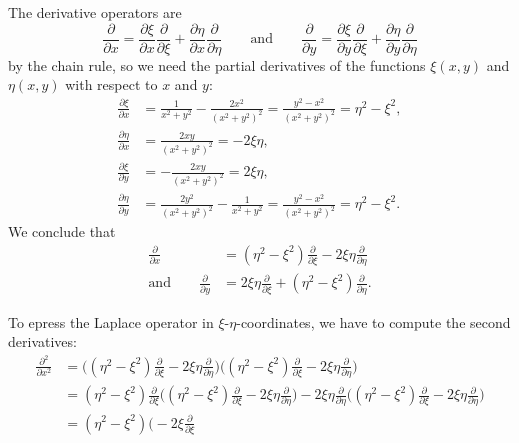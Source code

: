 \begin{loesung}
\begin{teilaufgaben}
\item
The derivative operators are 
\[
\frac{\partial}{\partial x}
=
\frac{\partial\xi}{\partial x}\frac{\partial}{\partial\xi}
+
\frac{\partial\eta}{\partial x}\frac{\partial}{\partial\eta}
\qquad\text{and}\qquad
\frac{\partial}{\partial y}
=
\frac{\partial\xi}{\partial y}\frac{\partial}{\partial\xi}
+
\frac{\partial\eta}{\partial y}\frac{\partial}{\partial\eta}
\]
by the chain rule, so we need the partial derivatives of the functions 
$\xi(x,y)$ and $\eta(x,y)$ with respect to $x$ and $y$:
\begin{align*}
\frac{\partial\xi}{\partial x}
&=
\frac{1}{x^2+y^2}-\frac{2x^2}{(x^2+y^2)^2}
=
\frac{y^2-x^2}{(x^2+y^2)^2}
=
\eta^2-\xi^2,
\\
\frac{\partial\eta}{\partial x}
&=
\frac{2xy}{(x^2+y^2)^2}
=-2\xi\eta,
\\
\frac{\partial\xi}{\partial y}
&=
-
\frac{2xy}{(x^2+y^2)^2}
=2\xi\eta,
\\
\frac{\partial\eta}{\partial y}
&=
\frac{2y^2}{(x^2+y^2)^2}-\frac{1}{x^2+y^2}
=
\frac{y^2-x^2}{(x^2+y^2)^2}
=
\eta^2-\xi^2.
\end{align*}
We conclude that
\begin{align*}
\frac{\partial}{\partial x}
&=
(\eta^2-\xi^2)
\frac{\partial}{\partial\xi}
-
2\xi\eta
\frac{\partial}{\partial\eta}
\\
\text{and}\qquad
\frac{\partial}{\partial y}
&=
2\xi\eta
\frac{\partial}{\partial\xi}
+
(\eta^2-\xi^2)
\frac{\partial}{\partial\eta}.
\end{align*}
\item
To epress the Laplace operator in $\xi$-$\eta$-coordinates, we have
to compute the second derivatives:
\begingroup
\allowdisplaybreaks
\begin{align*}
\frac{\partial^2}{\partial x^2}
&=
\biggl(
(\eta^2-\xi^2)
\frac{\partial}{\partial\xi}
-
2\xi\eta
\frac{\partial}{\partial\eta}
\biggr)
\biggl(
(\eta^2-\xi^2)
\frac{\partial}{\partial\xi}
-
2\xi\eta
\frac{\partial}{\partial\eta}
\biggr)
\\
&=
(\eta^2-\xi^2)\frac{\partial}{\partial\xi}
\biggl(
(\eta^2-\xi^2)
\frac{\partial}{\partial\xi}
-
2\xi\eta
\frac{\partial}{\partial\eta}
\biggr)
-2\xi\eta\frac{\partial}{\partial\eta}
\biggl(
(\eta^2-\xi^2)
\frac{\partial}{\partial\xi}
-
2\xi\eta
\frac{\partial}{\partial\eta}
\biggr)
\\
&=
(\eta^2-\xi^2)\biggl(
-2\xi\frac{\partial}{\partial\xi}

\end{align*}
\end{teilaufgaben}
\end{loesung}
